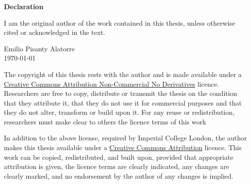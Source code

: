 




\chapter*{$\quad$}
\vspace{-2cm}

\noindent
\textbf{Declaration}


\noindent
I am the original author of the work contained in this thesis, unless otherwise cited or acknowledged in the text.

\vspace{0.5cm}

\noindent
Emilio Pisanty Alatorre
\\ \noindent \today

\vfill

\noindent
The copyright of this thesis rests with the author and is made available under a \href{http://creativecommons.org/licenses/by-nc-nd/4.0/}{Creative Commons Attribution Non-Commercial No Derivatives} licence. Researchers are free to copy, distribute or transmit the thesis on the condition that they attribute it, that they do not use it for commercial purposes and that they do not alter, transform or build upon it. For any reuse or redistribution, researchers must make clear to others the licence terms of this work

\vspace{7mm}

\noindent
In addition to the above license, required by Imperial College London, the author makes this thesis available under a \href{http://creativecommons.org/licenses/by/4.0/}{Creative Commons Attribution} licence. This work can be copied, redistributed, and built upon, provided that appropriate attribution is given, the licence terms are clearly indicated, any changes are clearly marked, and no endorsement by the author of any changes is implied.

\vspace{1cm}






